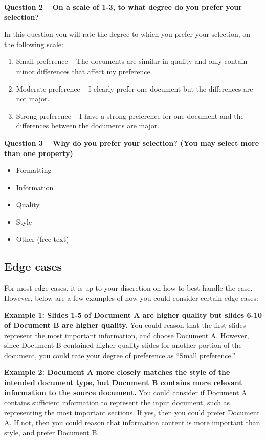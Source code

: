 \textbf{Question 2 – On a scale of 1-3, to what degree do you prefer your selection?
}

\noindent In this question you will rate the degree to which you prefer your selection, on the following scale:
\begin{enumerate}
    \item Small preference – The documents are similar in quality and only contain minor differences that affect my preference.
    \item Moderate preference – I clearly prefer one document but the differences are not major.
    \item Strong preference – I have a strong preference for one document and the differences between the documents are major.
\end{enumerate}

\textbf{Question 3 – Why do you prefer your selection? (You may select more than one property)}
\begin{itemize}
    \item[$\square$] Formatting
    \item[$\square$] Information
    \item[$\square$] Quality
    \item[$\square$] Style
    \item[$\square$] Other (free text)
\end{itemize}


\subsection{Edge cases}
For most edge cases, it is up to your discretion on how to best handle the case. However, below are a few examples of how you could consider certain edge cases:

\textbf{Example 1: Slides 1-5 of Document A are higher quality but slides 6-10 of Document B are higher quality.
}
You could reason that the first slides represent the most important information, and choose Document A. However, since Document B contained higher quality slides for another portion of the document, you could rate your degree of preference as “Small preference.”

\textbf{Example 2: Document A more closely matches the style of the intended document type, but Document B contains more relevant information to the source document.
}
You could consider if Document A contains sufficient information to represent the input document, such as representing the most important sections. If yes, then you could prefer Document A. If not, then you could reason that information content is more important than style, and prefer Document B.

